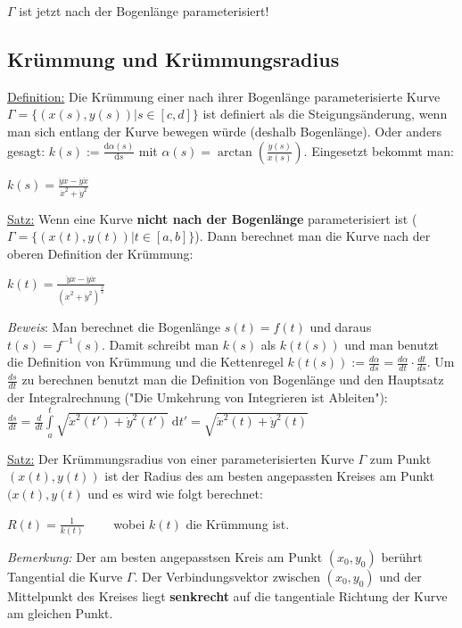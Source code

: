 \documentclass[11pt]{article} %
\begin{document}
$\Gamma$ ist jetzt nach der Bogenlänge parameterisiert!

\subsection{Krümmung und Krümmungsradius}

\underline{Definition:} Die Krümmung einer nach ihrer Bogenlänge parameterisierte Kurve $\Gamma = \{(x(s),y(s)) |s \in [c,d] \}$ ist definiert als die Steigungsänderung, wenn man sich entlang der Kurve bewegen würde (deshalb Bogenlänge). Oder anders gesagt: $k(s) := \frac{\text{d}\alpha(s)}{\text{d}s}$ mit $\alpha(s) = \arctan(\frac{\dot y(s)}{\dot x(s)})$. Eingesetzt bekommt man:
\begin{center}
$k(s) = \frac{\ddot y \dot x - \dot y \ddot x}{\dot x^2 +\dot y^2}$
\end{center}

\underline{Satz:} Wenn eine Kurve {\bf nicht nach der Bogenlänge} parameterisiert ist ($\Gamma =  \{(x(t),y(t)) |t \in [a,b] \}$). Dann berechnet man die Kurve nach der oberen Definition der Krümmung:

\begin{center}
$k(t) = \frac{\ddot y \dot x - \dot y \ddot x}{(\dot x^2 +\dot y^2)^\frac{3}{2}}$\\
\end{center}

\emph{Beweis}: Man berechnet die Bogenlänge $s(t) = f(t)$ und daraus $t(s) = f^{-1}(s)$. Damit schreibt man $k(s)$ als $k(t(s))$ und man benutzt die Definition von Krümmung und die Kettenregel $k(t(s)) := \frac{d\alpha}{ds} = \frac{d\alpha}{dt}\cdot \frac{dt}{ds}.$ Um $\frac{ds}{dt}$ zu berechnen benutzt man die Definition von Bogenlänge und den Hauptsatz der Integralrechnung ("Die Umkehrung von Integrieren ist Ableiten"):  $\frac{ds}{dt} = \frac{d}{dt}\int \limits_a^t \sqrt{\dot x^2(t') + \dot y^2(t')} \; \text{d}t' = \sqrt{\dot x^2(t) + \dot y^2(t)}$ 



\underline{Satz:} Der Krümmungsradius von einer parameterisierten Kurve $\Gamma$ zum Punkt $(x(t),y(t))$ ist der Radius des am besten angepassten Kreises am Punkt $(x(t),y(t)$ und es wird wie folgt berechnet:

\begin{center}
$R(t) = \frac{1}{k(t)} \qquad$ wobei $k(t)$ die Krümmung ist.
\end{center}

\emph{Bemerkung:} Der am besten angepasstsen Kreis am Punkt $(x_0,y_0)$ berührt Tangential die Kurve $\Gamma$. Der Verbindungsvektor zwischen $(x_0,y_0)$ und der Mittelpunkt des Kreises liegt {\bf senkrecht} auf die tangentiale Richtung der Kurve am gleichen Punkt.
\end{document}
